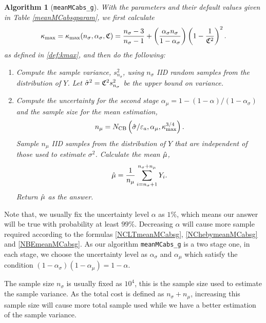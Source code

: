 \documentclass{iitthesis}
\newtheorem{algorithm}[theorem]{Algorithm}
\theoremstyle{definition}
\begin{document}
\begin{algorithm}[{\tt meanMCabs\_g}]
With the parameters and their default values given in Table \ref{meanMCabsgparam}, we first calculate 
\begin{equation}	\label{kmaxinalg}
\kappa_{\max}=\kappa_{\max}(n_\sigma,\alpha_\sigma,\mathfrak{C}) =\frac{n_\sigma-3}{n_\sigma-1} + \left(\frac{ \alpha_\sigma n_\sigma}{1-\alpha_\sigma}\right) \left(1 - \frac{1}{\mathfrak{C}^2}\right)^2.
\end{equation}
as defined in \eqref{def:kmax}, and then do the following:
\begin{enumerate}
\item Compute the sample variance, $s^2_{n_{\sigma}}$, using $n_\sigma$ IID random samples from the distribution of  $Y$. Let $\hat{\sigma}^2 = \mathfrak{C}^2 s^2_{n_\sigma}$ be the upper bound on variance.
\item Compute the uncertainty for the second stage $\alpha_\mu = 1-(1-\alpha)/(1-\alpha_{\sigma})$ and the sample size for the mean estimation,
\begin{align}\label{def:meanmcabsgnmu}
n_\mu = N_{\text{CB}} \left(\hat{\sigma}/\varepsilon_a,\alpha_\mu, \kappa_{\max}^{3/4}\right).
\end{align}
Sample $n_\mu$ IID samples from the distribution of $Y$ that are independent of those used to estimate $\sigma^2$. Calculate the mean $\hat{\mu}$,
\begin{align}\label{def:meanmcabsghmu}
\hat{\mu} = \frac{1}{n_\mu}\sum_{i = n_\sigma+1}^{n_\sigma+n_\mu}Y_i.
\end{align}
Return $\hat{\mu}$ as the answer.
\end{enumerate}

\end{algorithm}


Note that, we usually fix the uncertainty level $\alpha$ as $1\%$, which means our answer will be true with probability at least $99\%$. Decreasing $\alpha$ will cause more sample required according to the formulas \eqref{NCLTmeanMCabsg}, \eqref{NChebymeanMCabsg} and \eqref{NBEmeanMCabsg}. As our algorithm {\tt meanMCabs\_g} is a two stage one, in each stage, we choose the uncertainty level as $\alpha_\sigma$ and $\alpha_\mu$ which satisfy the condition $(1-\alpha_\sigma)(1-\alpha_\mu)=1-\alpha$.

The sample size $n_\sigma$ is usually fixed as $10^4$, this is the sample size used to estimate the sample variance. As the total cost is defined as $n_\sigma +n_\mu$, increasing this sample size will cause more total sample used while we have a better estimation of the sample variance. 
\end{document}
